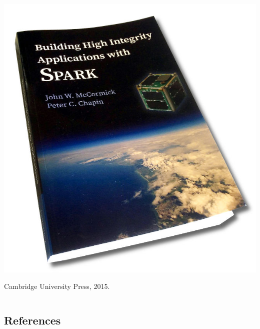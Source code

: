 \begin{frame}
\begin{columns}
\begin{column}[T]{.5\textwidth}
      \includegraphics[width=\textwidth]{content/images/spark/sparkbook2}\\
      \begin{center}
        Cambridge University Press, 2015.
      \end{center}
    \end{column}
  \end{columns}
\end{frame}
\addtocounter{clock}{2}

\subsection{References}

